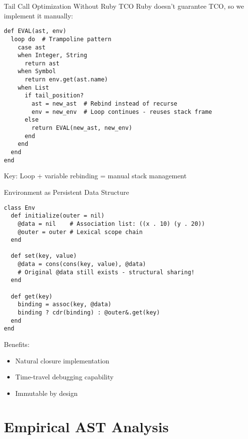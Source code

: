 \documentclass[presentation,aspectratio=169]{beamer}
\begin{document}
\begin{frame}[label={sec:org73eccae},fragile]{Tail Call Optimization Without Ruby TCO}
 Ruby doesn't guarantee TCO, so we implement it manually:

\begin{verbatim}
def EVAL(ast, env)
  loop do  # Trampoline pattern
    case ast
    when Integer, String
      return ast
    when Symbol  
      return env.get(ast.name)
    when List
      if tail_position?
        ast = new_ast  # Rebind instead of recurse
        env = new_env  # Loop continues - reuses stack frame
      else
        return EVAL(new_ast, new_env)
      end
    end
  end
end
\end{verbatim}

\alert{Key}: Loop + variable rebinding = manual stack management
\end{frame}
\begin{frame}[label={sec:orgd9f8cbb},fragile]{Environment as Persistent Data Structure}
 \begin{verbatim}
class Env
  def initialize(outer = nil)
    @data = nil    # Association list: ((x . 10) (y . 20))
    @outer = outer # Lexical scope chain
  end

  def set(key, value)
    @data = cons(cons(key, value), @data)
    # Original @data still exists - structural sharing!
  end

  def get(key)
    binding = assoc(key, @data)
    binding ? cdr(binding) : @outer&.get(key)
  end
end
\end{verbatim}

\alert{Benefits}:
\begin{itemize}
\item Natural closure implementation
\item Time-travel debugging capability
\item Immutable by design
\end{itemize}
\end{frame}
\section{Empirical AST Analysis}
\label{sec:org0693629}
\end{document}
